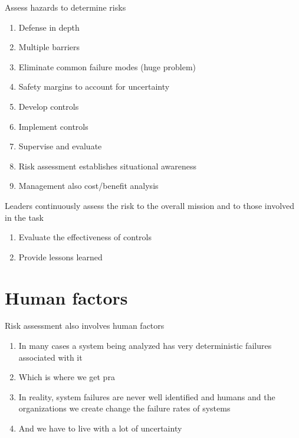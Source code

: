 \documentclass[aspectratio=1610,pdftex,dvipsnames,compress,xcolor={dvipsnames}]{beamer}
\newcommand{\acs}{\acrshort} %
\begin{document}
\addtocounter{framenumber}{-1}
\begin{frame}{Assess hazards to determine risks}
    \begin{enumerate}[series=outerlist,topsep=0pt,itemsep=11pt,leftmargin=*,label=(\arabic*)]
        \item[]Defense in depth   
        \item[]Multiple barriers
        \item[]Eliminate common failure modes (huge problem)
        \item[]Safety margins to account for uncertainty
        \item[]Develop controls  
        \item[]Implement controls  
        \item[]Supervise and evaluate  
        \item[]Risk assessment establishes situational awareness  
        \item[]Management also cost/benefit analysis
    \end{enumerate}
\end{frame}


\begin{frame}{Leaders continuously assess the risk to the overall mission and to those involved in the task}
    \begin{enumerate}[series=outerlist,topsep=0pt,itemsep=21pt,leftmargin=*,label=(\arabic*)]
        \item[]Evaluate the effectiveness of controls
        \item[]Provide lessons learned
    \end{enumerate}
\end{frame}


\section{Human factors}


\addtocounter{framenumber}{-1}
\begin{frame}{Risk assessment also involves human factors}
    \begin{enumerate}[series=outerlist,topsep=0pt,itemsep=21pt,leftmargin=*,label=(\arabic*)]
        \item[]In many cases a system being analyzed has very deterministic failures associated with it 
        \item[]Which is where we get \acs{pra}
        \item[]In reality, system failures are never well identified and humans and the organizations we create change the failure rates of systems
        \item[]And we have to live with a lot of uncertainty
    \end{enumerate}
\end{frame}
\end{document}
